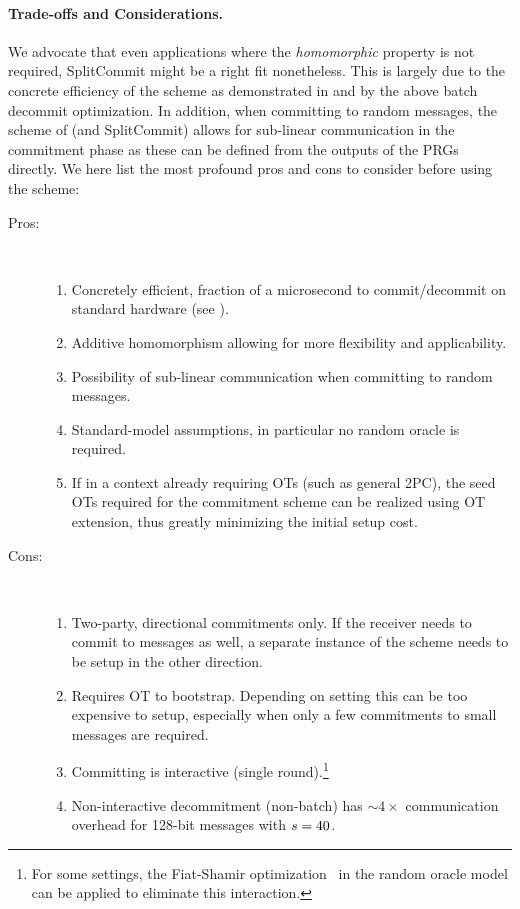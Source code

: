 \paragraph{Trade-offs and Considerations.}
We advocate that even applications where the \textit{homomorphic} property is not required, SplitCommit might be a right fit nonetheless. This is largely due to the concrete efficiency of the scheme as demonstrated in  and by the above batch decommit optimization. In addition, when committing to random messages, the scheme of \cite{DBLP:conf/tcc/FrederiksenJNT16} (and SplitCommit) allows for sub-linear communication in the commitment phase as these can be defined from the outputs of the PRGs directly. We here list the most profound pros and cons to consider before using the scheme:
\begin{description}
  \item[Pros:]
  ~
  \begin{enumerate}
     \item Concretely efficient, fraction of a microsecond to commit/decommit on standard hardware (see ).
     \item Additive homomorphism allowing for more flexibility and applicability.
     \item Possibility of sub-linear communication when committing to random messages.
     \item Standard-model assumptions, in particular no random oracle is required.
     \item If in a context already requiring OTs (such as general 2PC), the seed OTs required for the commitment scheme can be realized using OT extension, thus greatly minimizing the initial setup cost.
   \end{enumerate}
   \item[Cons:]
   ~
   \begin{enumerate}
     \item Two-party, directional commitments only. If the receiver needs to commit to messages as well, a separate instance of the scheme needs to be setup in the other direction.
     \item Requires OT to bootstrap. Depending on setting this can be too expensive to setup, especially when only a few commitments to small messages are required.
     \item Committing is interactive (single round).\footnote{For some settings, the Fiat-Shamir optimization~\cite{DBLP:conf/crypto/FiatS86} in the random oracle model can be applied to eliminate this interaction.}
     \item Non-interactive decommitment (non-batch) has $\sim4\times$ communication overhead for 128-bit messages with $s=40$.\samefootnote
   \end{enumerate}
\end{description}



